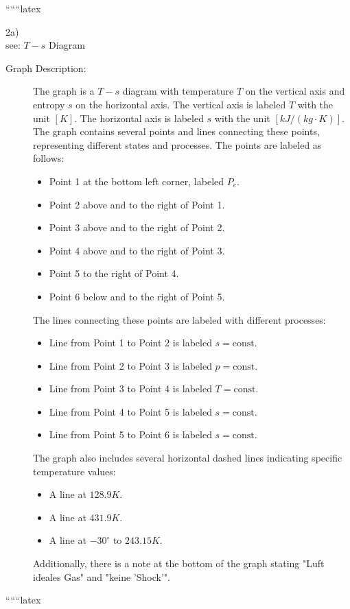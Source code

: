 
``````latex


2a) \\
see: \( T - s \) Diagram

\begin{description}
    \item[Graph Description:] 
    The graph is a \( T - s \) diagram with temperature \( T \) on the vertical axis and entropy \( s \) on the horizontal axis. The vertical axis is labeled \( T \) with the unit \([K]\). The horizontal axis is labeled \( s \) with the unit \([kJ/(kg \cdot K)]\). The graph contains several points and lines connecting these points, representing different states and processes. The points are labeled as follows:
    \begin{itemize}
        \item Point 1 at the bottom left corner, labeled \( P_e \).
        \item Point 2 above and to the right of Point 1.
        \item Point 3 above and to the right of Point 2.
        \item Point 4 above and to the right of Point 3.
        \item Point 5 to the right of Point 4.
        \item Point 6 below and to the right of Point 5.
    \end{itemize}
    The lines connecting these points are labeled with different processes:
    \begin{itemize}
        \item Line from Point 1 to Point 2 is labeled \( s = \text{const} \).
        \item Line from Point 2 to Point 3 is labeled \( p = \text{const} \).
        \item Line from Point 3 to Point 4 is labeled \( T = \text{const} \).
        \item Line from Point 4 to Point 5 is labeled \( s = \text{const} \).
        \item Line from Point 5 to Point 6 is labeled \( s = \text{const} \).
    \end{itemize}
    The graph also includes several horizontal dashed lines indicating specific temperature values:
    \begin{itemize}
        \item A line at \( 128.9K \).
        \item A line at \( 431.9K \).
        \item A line at \( -30^\circ \) to \( 243.15K \).
    \end{itemize}
    Additionally, there is a note at the bottom of the graph stating "Luft ideales Gas" and "keine 'Shock'".
\end{description}

``````latex


